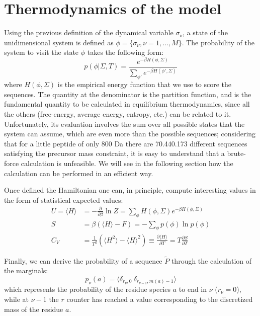 \section{Thermodynamics of the model}

Using the previous definition of the dynamical variable $\sigma_\nu$, a state of
the unidimensional system is defined as
$\phi=\{\sigma_\nu,\nu=1,\dots,M\}$.
The probability of the system to visit the state $\phi$ takes the following form:
\begin{equation}
p(\phi|\Sigma,T)=
\frac{e^{-\beta H(\phi,\Sigma)}}
{\sum_{\phi'} e^{-\beta H(\phi',\Sigma)}}
\label{pot}
\end{equation}
where $H(\phi,\Sigma)$ is the empirical energy function that we use to score the
sequences.
The quantity at the denominator is the partition function, and is the
fundamental quantity to be calculated in equilibrium thermodynamics, since all
the others (free-energy, average energy, entropy, etc.) can be related to it.
Unfortunately, its evaluation involves the sum over all possible states that the
system can assume, which are even more than the possible sequences; considering
that for a little peptide of
only 800 Da there are 70.440.173
different sequences satisfying the
precursor mass constraint, it is easy to understand that a brute-force
calculation is unfeasible.
We will see in the following section how the calculation can be performed in an
efficient way.


Once defined the Hamiltonian one can, in principle, compute interesting
values in the form of statistical expected values:
\begin{align}
U=\langle H \rangle 
&= 
-\frac{\partial}{\partial\beta} \ln Z =
\sum_\phi H(\phi,\Sigma)e^{-\beta H (\phi,\Sigma)}\\
S 
&= 
\beta \left(\langle H\rangle-F \right) =
-\sum_\phi p(\phi)\ln p(\phi)\\
C_V 
&= 
\frac 1 {T^2} \left(\langle H^2\rangle-\langle H\rangle^2\right) \equiv
\frac{\partial \langle H\rangle}{\partial T} = T \frac{\partial S}{\partial T}
\end{align}


Finally, we can derive the probability of a sequence $\widetilde P$ through the
calculation of the marginals:
\begin{equation}
p_\nu(a)=\langle
\delta_{r_\nu,0}\ \delta_{r_{\nu-1},m(a)-1} %
\rangle
\end{equation}
which represents the probability of the residue species $a$ to end in $\nu$
($r_\nu=0$), while at $\nu-1$ the $r$ counter has reached a value corresponding
to the discretized mass of the residue $a$.

